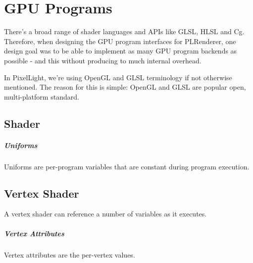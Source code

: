 \chapter{\ac{GPU} Programs}
There's a broad range of shader languages and \ac{API}s like \ac{GLSL}, \ac{HLSL} and Cg. Therefore, when designing the \ac{GPU} program interfaces for PLRenderer, one design goal was to be able to implement as many \ac{GPU} program backends as possible - and this without producing to much internal overhead.

In PixelLight, we're using \ac{OpenGL} and \ac{GLSL} terminology if not otherwise mentioned. The reason for this is simple: \ac{OpenGL} and \ac{GLSL} are popular open, multi-platform standard.




\section{Shader}


\paragraph{Uniforms}
Uniforms are per-program variables that are constant during program execution.




\section{Vertex Shader}
A vertex shader can reference a number of variables as it executes.


\paragraph{Vertex Attributes}
Vertex attributes are the per-vertex values.


